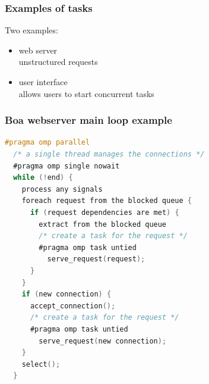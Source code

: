 \begin{frame}
  \frametitle{Examples of tasks}
  

\Large
  \begin{changemargin}{1cm}
   Two examples:
\vspace*{-1em}
   \begin{itemize}
     \item web server\\ \quad unstructured requests
     \item user interface\\ \quad allows users to start concurrent tasks
   \end{itemize}
  \end{changemargin}

\end{frame}

\begin{frame}[fragile]
  \frametitle{Boa webserver main loop example}
  

  \begin{changemargin}{2cm}
{\small
\begin{lstlisting}[language=C,morekeywords={foreach,pragma,omp,parallel,single,nowait,task,untied,barrier,taskyield}]
#pragma omp parallel
  /* a single thread manages the connections */
  #pragma omp single nowait
  while (!end) {
    process any signals
    foreach request from the blocked queue {
      if (request dependencies are met) {
        extract from the blocked queue
        /* create a task for the request */
        #pragma omp task untied
          serve_request(request);
      }
    }
    if (new connection) {
      accept_connection();
      /* create a task for the request */
      #pragma omp task untied
        serve_request(new connection);
    }
    select();
  }
\end{lstlisting}
}
  \end{changemargin}
  


\end{frame}

